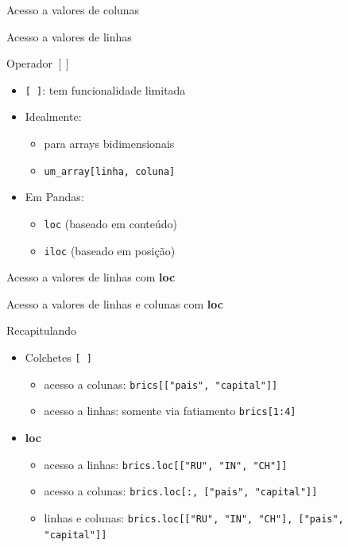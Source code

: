 %
\begin{frame}{Acesso a valores de colunas}
    
\end{frame}
%
\begin{frame}[t, fragile]{Acesso a valores de linhas}
    
\end{frame}
%
\begin{frame}[t, fragile]{Operador $[ ]$}
  \begin{itemize}
    \item \verb![ ]!: tem funcionalidade limitada 
    \item Idealmente:
    \begin{itemize}
      \item para arrays bidimensionais
      \item \verb!um_array[linha, coluna]!
    \end{itemize}
    \item Em Pandas:
    \begin{itemize}
      \item \verb!loc!  (baseado em conteúdo)
      \item \verb!iloc! (baseado em posição)
    \end{itemize}
  \end{itemize}
\end{frame}
%
\begin{frame}[t, fragile]{Acesso a valores de linhas com {\bf loc}}
    
\end{frame}
%
\begin{frame}[t, fragile]{Acesso a valores de linhas e colunas com {\bf loc}}
    
\end{frame}
%
\begin{frame}[t, fragile]{Recapitulando}
  \begin{itemize}
    \item Colchetes \verb![ ]! 
    \begin{itemize}
      \item acesso a colunas: \verb!brics[["pais", "capital"]]!  
      \item acesso a linhas: somente via fatiamento \verb!brics[1:4]!
    \end{itemize}
    \item {\bf loc}
    \begin{itemize}
      \item acesso a linhas: \verb!brics.loc[["RU", "IN", "CH"]]!  
      \item acesso a colunas: \verb!brics.loc[:, ["pais", "capital"]]! 
      \item linhas e colunas: \verb!brics.loc[["RU", "IN", "CH"], ["pais", "capital"]]!    
    \end{itemize}
  \end{itemize}
\end{frame}
